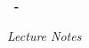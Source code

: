 \begin{titlepage}
    
    \centering
    

    \vspace*{5cm}
    {\huge\bfseries \courseCode\ - \courseTitle\par}
    \vspace{1.5cm}
    {\Large\itshape Lecture Notes\par}
    \vspace{1cm}
    {\Large\bfseries \authorName\par}
    \vspace{1cm}
    {\large \noteDate\par}

\end{titlepage}
